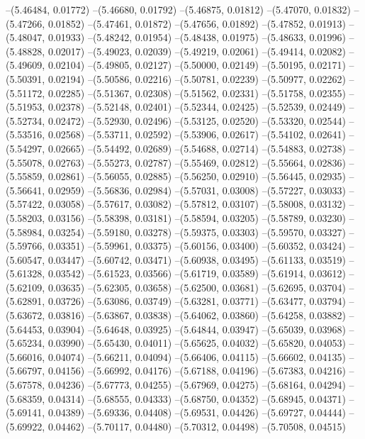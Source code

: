 --(5.46484, 0.01772)
--(5.46680, 0.01792)
--(5.46875, 0.01812)
--(5.47070, 0.01832)
--(5.47266, 0.01852)
--(5.47461, 0.01872)
--(5.47656, 0.01892)
--(5.47852, 0.01913)
--(5.48047, 0.01933)
--(5.48242, 0.01954)
--(5.48438, 0.01975)
--(5.48633, 0.01996)
--(5.48828, 0.02017)
--(5.49023, 0.02039)
--(5.49219, 0.02061)
--(5.49414, 0.02082)
--(5.49609, 0.02104)
--(5.49805, 0.02127)
--(5.50000, 0.02149)
--(5.50195, 0.02171)
--(5.50391, 0.02194)
--(5.50586, 0.02216)
--(5.50781, 0.02239)
--(5.50977, 0.02262)
--(5.51172, 0.02285)
--(5.51367, 0.02308)
--(5.51562, 0.02331)
--(5.51758, 0.02355)
--(5.51953, 0.02378)
--(5.52148, 0.02401)
--(5.52344, 0.02425)
--(5.52539, 0.02449)
--(5.52734, 0.02472)
--(5.52930, 0.02496)
--(5.53125, 0.02520)
--(5.53320, 0.02544)
--(5.53516, 0.02568)
--(5.53711, 0.02592)
--(5.53906, 0.02617)
--(5.54102, 0.02641)
--(5.54297, 0.02665)
--(5.54492, 0.02689)
--(5.54688, 0.02714)
--(5.54883, 0.02738)
--(5.55078, 0.02763)
--(5.55273, 0.02787)
--(5.55469, 0.02812)
--(5.55664, 0.02836)
--(5.55859, 0.02861)
--(5.56055, 0.02885)
--(5.56250, 0.02910)
--(5.56445, 0.02935)
--(5.56641, 0.02959)
--(5.56836, 0.02984)
--(5.57031, 0.03008)
--(5.57227, 0.03033)
--(5.57422, 0.03058)
--(5.57617, 0.03082)
--(5.57812, 0.03107)
--(5.58008, 0.03132)
--(5.58203, 0.03156)
--(5.58398, 0.03181)
--(5.58594, 0.03205)
--(5.58789, 0.03230)
--(5.58984, 0.03254)
--(5.59180, 0.03278)
--(5.59375, 0.03303)
--(5.59570, 0.03327)
--(5.59766, 0.03351)
--(5.59961, 0.03375)
--(5.60156, 0.03400)
--(5.60352, 0.03424)
--(5.60547, 0.03447)
--(5.60742, 0.03471)
--(5.60938, 0.03495)
--(5.61133, 0.03519)
--(5.61328, 0.03542)
--(5.61523, 0.03566)
--(5.61719, 0.03589)
--(5.61914, 0.03612)
--(5.62109, 0.03635)
--(5.62305, 0.03658)
--(5.62500, 0.03681)
--(5.62695, 0.03704)
--(5.62891, 0.03726)
--(5.63086, 0.03749)
--(5.63281, 0.03771)
--(5.63477, 0.03794)
--(5.63672, 0.03816)
--(5.63867, 0.03838)
--(5.64062, 0.03860)
--(5.64258, 0.03882)
--(5.64453, 0.03904)
--(5.64648, 0.03925)
--(5.64844, 0.03947)
--(5.65039, 0.03968)
--(5.65234, 0.03990)
--(5.65430, 0.04011)
--(5.65625, 0.04032)
--(5.65820, 0.04053)
--(5.66016, 0.04074)
--(5.66211, 0.04094)
--(5.66406, 0.04115)
--(5.66602, 0.04135)
--(5.66797, 0.04156)
--(5.66992, 0.04176)
--(5.67188, 0.04196)
--(5.67383, 0.04216)
--(5.67578, 0.04236)
--(5.67773, 0.04255)
--(5.67969, 0.04275)
--(5.68164, 0.04294)
--(5.68359, 0.04314)
--(5.68555, 0.04333)
--(5.68750, 0.04352)
--(5.68945, 0.04371)
--(5.69141, 0.04389)
--(5.69336, 0.04408)
--(5.69531, 0.04426)
--(5.69727, 0.04444)
--(5.69922, 0.04462)
--(5.70117, 0.04480)
--(5.70312, 0.04498)
--(5.70508, 0.04515)
